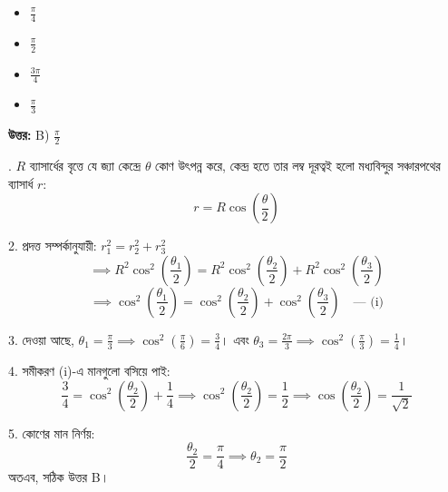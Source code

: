 \documentclass[12pt, a4paper]{article}
\begin{document}
\begin{itemize}[label={}, leftmargin=1cm, itemsep=0.5em]
    \item[\textbf{A)}] $\frac{\pi}{4}$
    \item[\textbf{B)}] $\frac{\pi}{2}$
    \item[\textbf{C)}] $\frac{3\pi}{4}$
    \item[\textbf{D)}] $\frac{\pi}{3}$
\end{itemize}

\vspace{0.5em}
\begin{tcolorbox}[answerbox]
    \textbf{\color{success} উত্তর:} B) $\frac{\pi}{2}$
\end{tcolorbox}
\vspace{1em}

\begin{tcolorbox}[solutionbox={সমাধান (Solution)}]
    . $R$ ব্যাসার্ধের বৃত্তে যে জ্যা কেন্দ্রে $\theta$ কোণ উৎপন্ন করে, কেন্দ্র হতে তার লম্ব দূরত্বই হলো মধ্যবিন্দুর সঞ্চারপথের ব্যাসার্ধ $r$:
    \[ r = R \cos\left(\frac{\theta}{2}\right) \]
    
    2. প্রদত্ত সম্পর্কানুযায়ী: $r_1^2 = r_2^2 + r_3^2$
    \[ \implies R^2 \cos^2\left(\frac{\theta_1}{2}\right) = R^2 \cos^2\left(\frac{\theta_2}{2}\right) + R^2 \cos^2\left(\frac{\theta_3}{2}\right) \]
    \[ \implies \cos^2\left(\frac{\theta_1}{2}\right) = \cos^2\left(\frac{\theta_2}{2}\right) + \cos^2\left(\frac{\theta_3}{2}\right) \quad \text{--- (i)} \]
    
    3. দেওয়া আছে, $\theta_1 = \frac{\pi}{3} \implies \cos^2\left(\frac{\pi}{6}\right) = \frac{3}{4}$। 
    এবং $\theta_3 = \frac{2\pi}{3} \implies \cos^2\left(\frac{\pi}{3}\right) = \frac{1}{4}$।
    
    \vspace{0.5em}
    4. সমীকরণ (i)-এ মানগুলো বসিয়ে পাই:
    \[ \frac{3}{4} = \cos^2\left(\frac{\theta_2}{2}\right) + \frac{1}{4} \implies \cos^2\left(\frac{\theta_2}{2}\right) = \frac{1}{2} \implies \cos\left(\frac{\theta_2}{2}\right) = \frac{1}{\sqrt{2}} \]
    
    5. কোণের মান নির্ণয়:
    \[ \frac{\theta_2}{2} = \frac{\pi}{4} \implies \theta_2 = \frac{\pi}{2} \]
    অতএব, সঠিক উত্তর B।
\end{tcolorbox}
\end{document}
